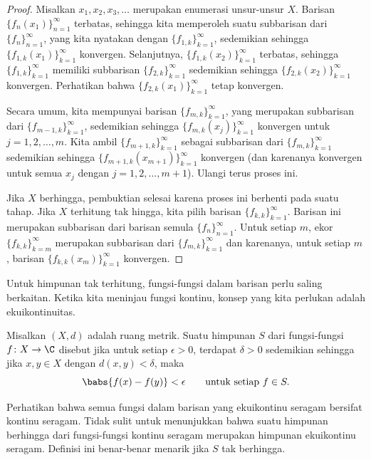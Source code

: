 \begin{proof}
Misalkan $x_1,x_2,x_3,\ldots$ merupakan enumerasi unsur-unsur $X$.
Barisan $\{ f_n(x_1) \}_{n=1}^\infty$ terbatas, sehingga
kita memperoleh suatu subbarisan dari $\{ f_n \}_{n=1}^{\infty}$, yang kita nyatakan dengan
$\{ f_{1,k} \}_{k=1}^\infty$,
sedemikian sehingga
$\{ f_{1,k}(x_1) \}_{k=1}^\infty$ konvergen.
Selanjutnya, $\{ f_{1,k}(x_2) \}_{k=1}^\infty$ terbatas, sehingga
$\{ f_{1,k} \}_{k=1}^\infty$ memiliki subbarisan
$\{ f_{2,k} \}_{k=1}^\infty$ sedemikian sehingga
$\{ f_{2,k}(x_2) \}_{k=1}^\infty$ konvergen.  Perhatikan bahwa
$\{ f_{2,k}(x_1) \}_{k=1}^\infty$ tetap konvergen.

Secara umum, kita mempunyai barisan $\{ f_{m,k} \}_{k=1}^\infty$,
yang merupakan subbarisan dari $\{ f_{m-1,k} \}_{k=1}^\infty$,
sedemikian sehingga $\{ f_{m,k}(x_j) \}_{k=1}^\infty$ konvergen untuk $j=1,2,\ldots, m$.
Kita ambil $\{ f_{m+1,k} \}_{k=1}^\infty$ sebagai subbarisan dari
$\{ f_{m,k} \}_{k=1}^\infty$
sedemikian sehingga
$\{ f_{m+1,k}(x_{m+1}) \}_{k=1}^\infty$ konvergen (dan karenanya konvergen untuk semua
$x_j$ dengan $j=1,2,\ldots,m+1$).  Ulangi terus proses ini.

Jika $X$ berhingga, pembuktian selesai karena proses ini berhenti pada suatu tahap.
Jika $X$ terhitung tak hingga,
kita pilih barisan
$\{ f_{k,k} \}_{k=1}^\infty$.
Barisan ini merupakan subbarisan dari barisan semula $\{ f_n \}_{n=1}^\infty$.
Untuk setiap $m$, ekor $\{ f_{k,k} \}_{k=m}^\infty$ merupakan subbarisan dari
$\{ f_{m,k} \}_{k=1}^\infty$
dan karenanya, untuk setiap $m$, barisan $\{ f_{k,k}(x_m) \}_{k=1}^\infty$ konvergen.
\end{proof}

Untuk himpunan tak terhitung,
fungsi-fungsi dalam barisan perlu saling berkaitan.  Ketika kita meninjau
fungsi kontinu, konsep yang kita perlukan adalah ekuikontinuitas.

\begin{defn}
Misalkan $(X,d)$ adalah ruang metrik.
Suatu himpunan $S$ dari fungsi-fungsi
$f \colon X \to \C$ disebut
\emph{}
jika untuk setiap $\epsilon > 0$, terdapat $\delta > 0$
sedemikian sehingga jika $x,y \in X$ dengan $d(x,y) < \delta$, maka
\begin{equation*}
\babs{f(x)-f(y)} < \epsilon \qquad \text{untuk setiap } f \in S .
\end{equation*}
\end{defn}

Perhatikan bahwa semua fungsi dalam barisan yang ekuikontinu seragam
bersifat kontinu seragam.  Tidak sulit untuk menunjukkan bahwa suatu
himpunan berhingga dari fungsi-fungsi kontinu seragam merupakan himpunan
ekuikontinu seragam.  Definisi ini benar-benar menarik jika $S$ tak berhingga.

